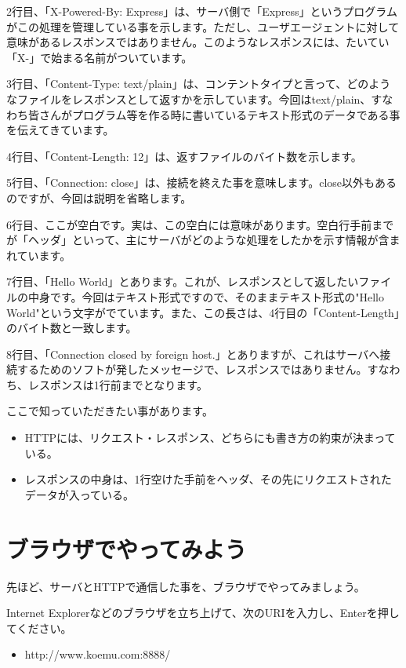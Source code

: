 \documentclass[a4j,11pt,openany]{jsbook}
\begin{document}
2行目、「X-Powered-By: Express」は、サーバ側で「Express」というプログラムがこの処理を管理している事を示します。ただし、ユーザエージェントに対して意味があるレスポンスではありません。このようなレスポンスには、たいてい「X-」で始まる名前がついています。

3行目、「Content-Type: text/plain」は、コンテントタイプと言って、どのようなファイルをレスポンスとして返すかを示しています。今回はtext/plain、すなわち皆さんがプログラム等を作る時に書いているテキスト形式のデータである事を伝えてきています。

4行目、「Content-Length: 12」は、返すファイルのバイト数を示します。

5行目、「Connection: close」は、接続を終えた事を意味します。close以外もあるのですが、今回は説明を省略します。

6行目、ここが空白です。実は、この空白には意味があります。空白行手前までが「ヘッダ」といって、主にサーバがどのような処理をしたかを示す情報が含まれています。

7行目、「Hello World」とあります。これが、レスポンスとして返したいファイルの中身です。今回はテキスト形式ですので、そのままテキスト形式の"Hello World"という文字がでています。また、この長さは、4行目の「Content-Length」のバイト数と一致します。

8行目、「Connection closed by foreign host.」とありますが、これはサーバへ接続するためのソフトが発したメッセージで、レスポンスではありません。すなわち、レスポンスは1行前までとなります。

ここで知っていただきたい事があります。

\begin{itemize}
    \item HTTPには、リクエスト・レスポンス、どちらにも書き方の約束が決まっている。
    \item レスポンスの中身は、1行空けた手前をヘッダ、その先にリクエストされたデータが入っている。
\end{itemize}

\section{ブラウザでやってみよう}

先ほど、サーバとHTTPで通信した事を、ブラウザでやってみましょう。

Internet Explorerなどのブラウザを立ち上げて、次のURIを入力し、Enterを押してください。

\begin{itemize}
    \item http://www.koemu.com:8888/
\end{itemize}
\end{document}
